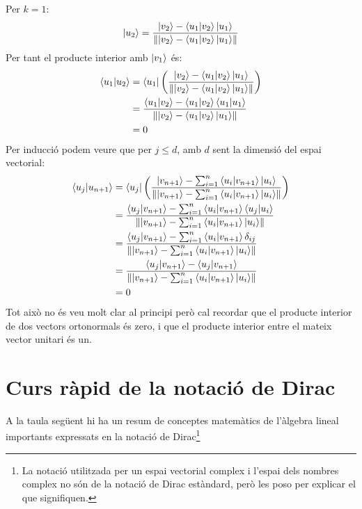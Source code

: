 Per $k=1$:
$$
\ket{u_2} = \frac{\ket{v_2} - \bra{u_1}\ket{v_2}\ket{u_1}}{\norm{\ket{v_2} - \bra{u_1}\ket{v_2}\ket{u_1}}}
$$
Per tant el producte interior amb $\ket{v_1}$ és:
$$
\begin{aligned}
\bra{u_1}\ket{u_2} 
&= \bra{u_1} \left( \frac{\ket{v_2} - \bra{u_1}\ket{v_2}\ket{u_1}}{\norm{\ket{v_2} - \bra{u_1}\ket{v_2}\ket{u_1}}} \right) \\
&= \frac{\bra{u_1}\ket{v_2} - \bra{u_1}\ket{v_2}\bra{u_1}\ket{u_1}}{\norm{\ket{v_2} - \bra{u_1}\ket{v_2}\ket{u_1}}} \\
&= 0
\end{aligned}
$$
Per inducció podem veure que per $j \leq d$, amb $d$ sent la dimensió del espai vectorial:
$$
\begin{aligned}
	\bra{u_j}\ket{u_{n+1}} 
	& = \bra{u_j} \left( \frac{\ket{v_{n+1}} - \sum_{i=1}^{n} \bra{u_i}\ket{v_{n+1}}\ket{u_i}}{\norm{\ket{v_{n+1}} - \sum_{i=1}^{n} \bra{u_i}\ket{v_{n+1}}\ket{u_i}}} \right) \\
	& = \frac{\bra{u_j}\ket{v_{n+1}} - \sum_{i=1}^{n} \bra{u_i}\ket{v_{n+1}} \bra{u_j}\ket{u_i}}{\norm{\ket{v_{n+1}} - \sum_{i=1}^{n} \bra{u_i}\ket{v_{n+1}} \ket{u_i}}} \\
	& = \frac{\bra{u_j}\ket{v_{n+1}} - \sum_{i=1}^{n} \bra{u_i}\ket{v_{n+1}} \delta_{ij}}{\norm{\ket{v_{n+1}} - \sum_{i=1}^{n} \bra{u_i}\ket{v_{n+1}} \ket{u_i}}} \\
	& = \frac{\bra{u_j}\ket{v_{n+1}} - \bra{u_j}\ket{v_{n+1}}}{\norm{\ket{v_{n+1}} - \sum_{i=1}^{n} \bra{u_i}\ket{v_{n+1}} \ket{u_i}}} \\
	& = 0	\\
\end{aligned}
$$
Tot això no és veu molt clar al principi però cal recordar que el producte interior de dos vectors ortonormals és zero, i que el producte interior entre el mateix vector unitari és un.

\section{Curs ràpid de la notació de Dirac}
A la taula següent hi ha un resum de conceptes matemàtics de l'àlgebra lineal importants expressats en la notació de Dirac\footnote{La notació utilitzada per un espai vectorial complex i l'espai dels nombres complex no són de la notació de Dirac estàndard, però les poso per explicar el que signifiquen.} \cite{QCandQI:dirac_notation}

